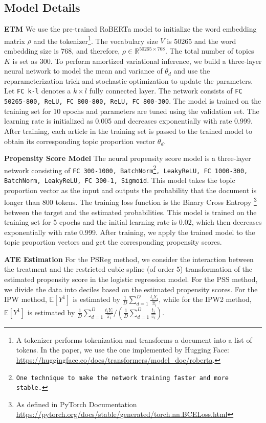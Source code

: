 \documentclass{article}
\begin{document}
	\subsection{Model Details}
	\textbf{ETM} We use the pre-trained RoBERTa model \parencite{liu2019roberta} to initialize the word embedding matrix $\rho$ and the tokenizer\footnote{A tokenizer performs tokenization and transforms a document into a list of tokens. In the paper, we use the one implemented by Hugging Face: \url{https://huggingface.co/docs/transformers/model_doc/roberta}.}. The vocabulary size $V$ is 50265 and the word embedding size is 768, and therefore, $\rho\in \mathbb{R}^{50265 \times 768}$. The total number of topics $K$ is set as 300. To perform amortized variational inference, we build a three-layer neural network to model the mean and variance of $\theta_d$ and use the reparameterization trick \parencite{kingma2013auto, titsias2014doubly} and stochastic optimization to update the parameters. Let \texttt{FC k-l} denotes a $k\times l$ fully connected layer. The network consists of \texttt{FC 50265-800, ReLU, FC 800-800, ReLU, FC 800-300}. The model is trained on the training set for 10 epochs and parameters are tuned using the validation set. The learning rate is initialized as 0.005 and decreases exponentially with rate 0.999. After training, each article in the training set is passed to the trained model to obtain its corresponding topic proportion vector $\theta_d$. 
	
	\textbf{Propensity Score Model} The neural propensity score model is a three-layer network consisting of \texttt{FC 300-1000, BatchNorm\footnote{One technique to make the network training faster and more stable.}, LeakyReLU, FC 1000-300, BatchNorm, LeakyReLU, FC 300-1, Sigmoid}. This model takes the topic proportion vector as the input and outputs the probability that the document is longer than 800 tokens. The training loss function is the Binary Cross Entropy \footnote{As defined in PyTorch Documentation \url{https://pytorch.org/docs/stable/generated/torch.nn.BCELoss.html}} between the target and the estimated probabilities. This model is trained on the training set for 5 epochs and the initial learning rate is 0.02, which then decreases exponentially with rate 0.999. After training, we apply the trained model to the topic proportion vectors and get the corresponding propensity scores. 
	
	\textbf{ATE Estimation} For the PSReg method, we consider the interaction between the treatment and the restricted cubic spline (of order 5) transformation of the estimated propensity score in the logistic regression model. For the PSS method, we divide the data into deciles based on the estimated propensity scores. For the IPW method, $\mathbb{E}[Y^1]$ is estimated by $\frac{1}{D} \sum_{d=1}^D\frac{t_i Y_i}{\hat{\pi_i}}$, while for the IPW2 method, $\mathbb{E}[Y^1]$ is estimated by $\frac{1}{D}\sum_{d=1}^D \frac{t_i Y_i}{\hat{\pi_i}} / (\frac{1}{D}  \sum_{d=1}^D\frac{t_i}{\hat{\pi_i}})$.
	
\end{document}
